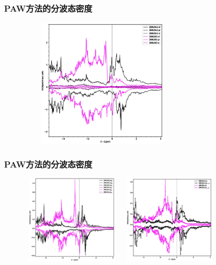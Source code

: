 \documentclass[cjk,slidestop,handout,compress,mathserif,blue]{beamer}	%
\begin{document}
\frame
{
	\frametitle{\textrm{PAW}方法的分波态密度}
\begin{figure}[h!]
\centering
\includegraphics[height=2.5in,width=3.2in,viewport=0 0 420 400,clip]{Figures/Ni_Re-1.jpg}
\caption{\fontsize{7.2pt}{4.2pt}}%
\label{Ni-Re-DOS}
\end{figure} 
}

\frame
{
	\frametitle{\textrm{PAW}方法的分波态密度}
\begin{figure}[h!]
\includegraphics[height=1.7in,width=1.95in,viewport=0 0 420 400,clip]{Figures/Ni_Re-2.jpg}
\includegraphics[height=1.7in,width=1.95in,viewport=0 0 420 400,clip]{Figures/Ni_Re-3.jpg}
\caption{\fontsize{7.2pt}{4.2pt}}%
\label{Ni-Re-DOS-d}
\end{figure} 
}
\end{document}
